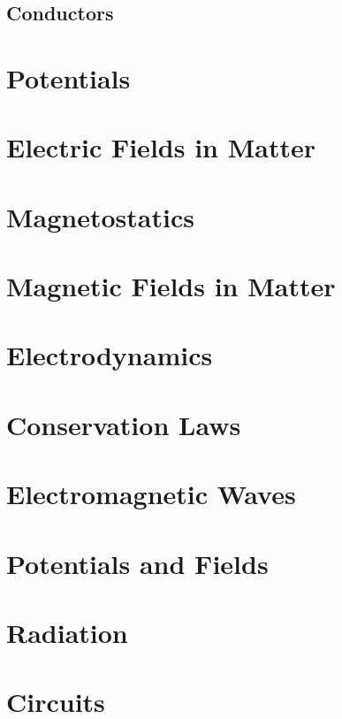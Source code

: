 \subsection{Conductors}


\section{Potentials}


\section{Electric Fields in Matter}
\section{Magnetostatics}
\section{Magnetic Fields in Matter}
\section{Electrodynamics}
\section{Conservation Laws}
\section{Electromagnetic Waves}
\section{Potentials and Fields}
\section{Radiation}
\section{Circuits}

